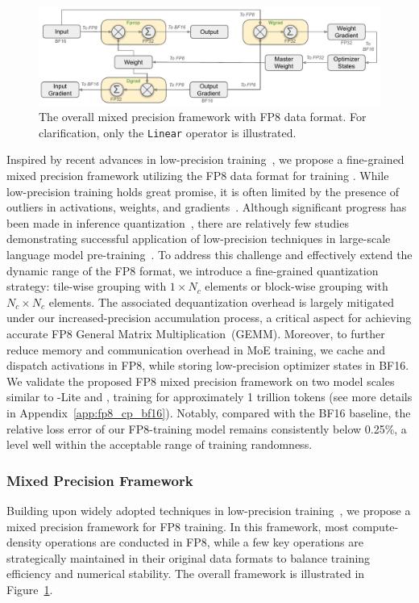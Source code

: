 \begin{figure}[!t]
\centering
\includegraphics[width=0.99\linewidth]{figures/fp8-frameworkv3.pdf}
\caption{
    The overall mixed precision framework with FP8 data format. For clarification, only the \texttt{Linear} operator is illustrated. 
}
\label{fig:fp8_framework}
\end{figure}

Inspired by recent advances in low-precision training~\citep{fp8lm, llm.int8, 8-bit-numerical}, we propose a fine-grained mixed precision framework utilizing the FP8 data format for training \dsviii{}. 
While low-precision training holds great promise, it is often limited by the presence of outliers in activations, weights, and gradients~\citep{massiveoutlier, understandoutlier, scalefp8train}. 
Although significant progress has been made in inference quantization~\citep{xiao2023smoothquant, frantar2022gptq}, there are relatively few studies demonstrating successful application of low-precision techniques in large-scale language model pre-training~\citep{scalefp8train}. 
To address this challenge and effectively extend the dynamic range of the FP8 format, we introduce a fine-grained quantization strategy: tile-wise grouping with $1\times N_c$ elements or block-wise grouping with $N_c\times N_c$ elements. 
The associated dequantization overhead is largely mitigated under our increased-precision accumulation process, a critical aspect for achieving accurate FP8 General Matrix Multiplication~(GEMM). 
Moreover, to further reduce memory and communication overhead in MoE training, we cache and dispatch activations in FP8, while storing low-precision optimizer states in BF16. 
We validate the proposed FP8 mixed precision framework on two model scales similar to \dsvii{}-Lite and \dsvii{}, training for approximately 1 trillion tokens (see more details in Appendix~\ref{app:fp8_cp_bf16}). 
Notably, compared with the BF16 baseline, the relative loss error of our FP8-training model remains consistently below 0.25\%, a level well within the acceptable range of training randomness.

\subsubsection{Mixed Precision Framework}
Building upon widely adopted techniques in low-precision training~\citep{bf16train, fp16train}, we propose a mixed precision framework for FP8 training. 
In this framework, most compute-density operations are conducted in FP8, while a few key operations are strategically maintained in their original data formats to balance training efficiency and numerical stability. 
The overall framework is illustrated in Figure~\ref{fig:fp8_framework}.

